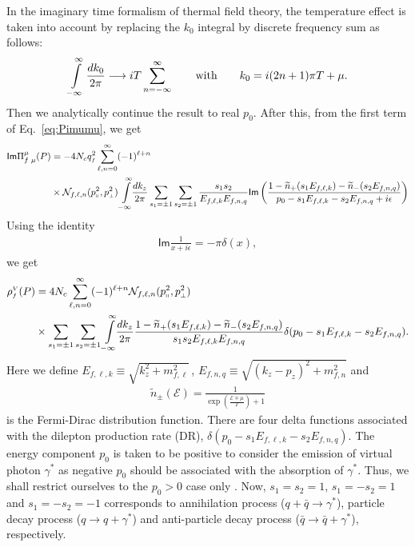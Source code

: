 \documentclass[aps,prd,floatfix,showpacs,showkeys,superscriptadress,unsortedaddress,nofootinbib,onecolumn]{revtex4-1}
\newcommand{\sF}{\scriptscriptstyle{f}}
\newcommand{\sV}{\scriptscriptstyle{V}}
\newcommand{\sperp}{\scriptscriptstyle{\perp}}
\newcommand{\wt}[1]{\widetilde{#1}}
\newcommand{\shp}{\shortparallel}
\newcommand{\nn}{\nonumber \\}
\begin{document}
In the imaginary time formalism of thermal field theory, the temperature effect is taken into account by replacing the $k_0$ integral by discrete frequency sum as follows: 
\begin{align}
\int\limits_{-\infty}^{\infty}\frac{dk_0}{2\pi} \longrightarrow iT\sum_{n=-\infty}^{\infty}\qquad{\rm with}\qquad k_0 = i(2n+1)\pi T + \mu.
\end{align}
Then we analytically continue the result to real $p_0$.
After this,  from the first term of Eq.~\eqref{eq:Pimumu}, we get
\begin{align}
\mathsf{Im}\Pi^{\mu}_{f\,\,\mu}(P) &=-4N_cq_{\sF}^2\sum_{\ell,n=0}^{\infty}(-1)^{\ell+n}\nn &\times\mathcal{N}_{f,\ell,n}(p_{\shp}^2,p_{\sperp}^2)\int\limits_{-\infty}^{\infty}\!\!\frac{dk_z}{2\pi}\sum_{s_1=\pm 1}\sum_{s_2=\pm 1}\frac{s_1s_2}{E_{f,\ell,k}E_{f,n,q}}\mathsf{Im}\left(\frac{1-\wt{n}_{+}(s_1E_{f,\ell,k})-\wt{n}_{-}(s_2E_{f,n,q})}{p_0-s_1E_{f,\ell,k}-s_2E_{f,n,q}+i\epsilon}\right)
\end{align}
Using the identity 
\begin{align}
\textsf{Im}\frac{1}{x+i\epsilon} = -\pi\delta(x),
\end{align}
we get
\begin{align}
\rho^{\sV}_{\sF}(P) &= 4N_c\sum_{\ell,n=0}^{\infty}(-1)^{\ell+n}\mathcal{N}_{f,\ell,n}(p_{\shp}^2,p_{\sperp}^2)\nn
&\times\sum_{s_1=\pm 1}\sum_{s_2=\pm 1}\int\limits_{-\infty}^{\infty}\!\!\frac{dk_z}{2\pi}\frac{1-\wt{n}_{+}(s_1E_{f,\ell,k})-\wt{n}_{-}(s_2E_{f,n,q})}{s_1s_2E_{f,\ell,k}E_{f,n,q}}\delta(p_0-s_1E_{f,\ell,k}-s_2E_{f,n,q}).\label{eq:expression_tot_rhoV}
\end{align}
Here we define $E_{f,\ell,k} \equiv \sqrt{k_z^2+m_{f,\ell}^2}$\,, $E_{f,n,q} \equiv \sqrt{(k_z-p_z)^2+m_{f,n}^2}$ and
\begin{align}
\wt{n}_{\pm}(\mathcal{E}) = \frac{1}{\exp(\frac{\mathcal{E}\mp\mu}{T})+1}
\end{align}
is the Fermi-Dirac distribution function.
There are four delta functions associated with the dilepton production rate (DR), $\delta \left(p_0-s_1E_{f,\ell,k}-s_2E_{f,n,q}\right)$.
The energy component $p_0$ is taken to be positive to consider the emission of virtual photon $\gamma^{*}$ as negative $p_0$ should be associated with the absorption of $\gamma^{*}$. Thus, we shall restrict ourselves to the $p_0>0$ case only . Now, $s_1=s_2=1$, $s_1=-s_2=1$ and $s_1=-s_2=-1$ corresponds to annihilation process ($q+\bar{q}\rightarrow \gamma^{*}$), particle decay process ($q\rightarrow q+\gamma^{*}$) and anti-particle decay process ($\bar{q}\rightarrow \bar{q}+\gamma^{*}$), respectively.
\end{document}
